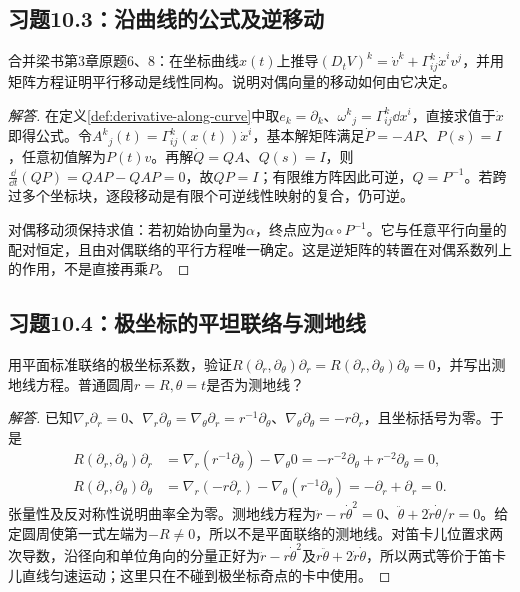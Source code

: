 \subsection*{习题10.3：沿曲线的公式及逆移动}
合并梁书第3章原题6、8：在坐标曲线$x(t)$上推导$(D_tV)^k=\dot v^k+\Gamma^k_{ij}\dot x^iv^j$，并用矩阵方程证明平行移动是线性同构。说明对偶向量的移动如何由它决定。
\begin{proof}[解答]
在定义\ref{def:derivative-along-curve}中取$e_k=\partial_k$、$\omega^k{}_j=\Gamma^k_{ij}\dd x^i$，直接求值于$\dot x$即得公式。令$A^k{}_j(t)=\Gamma^k_{ij}(x(t))\dot x^i$，基本解矩阵满足$\dot P=-AP$、$P(s)=I$，任意初值解为$P(t)v$。再解$\dot Q=QA$、$Q(s)=I$，则$\frac{\dd}{\dd t}(QP)=QAP-QAP=0$，故$QP=I$；有限维方阵因此可逆，$Q=P^{-1}$。若跨过多个坐标块，逐段移动是有限个可逆线性映射的复合，仍可逆。

对偶移动须保持求值：若初始协向量为$\alpha$，终点应为$\alpha\circ P^{-1}$。它与任意平行向量的配对恒定，且由对偶联络的平行方程唯一确定。这是逆矩阵的转置在对偶系数列上的作用，不是直接再乘$P$。
\end{proof}

\subsection*{习题10.4：极坐标的平坦联络与测地线}
用平面标准联络的极坐标系数，验证$R(\partial_r,\partial_\theta)\partial_r=R(\partial_r,\partial_\theta)\partial_\theta=0$，并写出测地线方程。普通圆周$r=R,\theta=t$是否为测地线？
\begin{proof}[解答]
已知$\nabla_r\partial_r=0$、$\nabla_r\partial_\theta=\nabla_\theta\partial_r=r^{-1}\partial_\theta$、$\nabla_\theta\partial_\theta=-r\partial_r$，且坐标括号为零。于是
\begin{align*}
 R(\partial_r,\partial_\theta)\partial_r
 &=\nabla_r(r^{-1}\partial_\theta)-\nabla_\theta0
 =-r^{-2}\partial_\theta+r^{-2}\partial_\theta=0,\\
 R(\partial_r,\partial_\theta)\partial_\theta
 &=\nabla_r(-r\partial_r)-\nabla_\theta(r^{-1}\partial_\theta)
 =-\partial_r+\partial_r=0.
\end{align*}
张量性及反对称性说明曲率全为零。测地线方程为$\ddot r-r\dot\theta^2=0$、$\ddot\theta+2\dot r\dot\theta/r=0$。给定圆周使第一式左端为$-R\ne0$，所以不是平面联络的测地线。对笛卡儿位置求两次导数，沿径向和单位角向的分量正好为$\ddot r-r\dot\theta^2$及$r\ddot\theta+2\dot r\dot\theta$，所以两式等价于笛卡儿直线匀速运动；这里只在不碰到极坐标奇点的卡中使用。
\end{proof}

